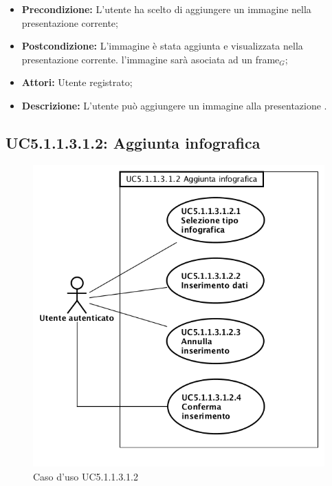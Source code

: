 \begin{itemize}
	\item \textbf{Precondizione:} L'utente ha scelto di aggiungere un immagine nella presentazione corrente;
	\item \textbf{Postcondizione:} L'immagine è stata aggiunta e visualizzata nella presentazione corrente. l'immagine sarà asociata ad un frame$_G$;
	\item \textbf{Attori:} Utente registrato;
	\item \textbf{Descrizione:} L'utente può aggiungere un immagine alla presentazione .
\end{itemize}

\subsection{ UC5.1.1.3.1.2: Aggiunta infografica}
\begin{figure}[h]
	\begin{center}
	\includegraphics[scale=0.6]{diagram/UC5-1-1-3-1-2.png}
	\caption{Caso d'uso UC5.1.1.3.1.2}
	\end{center}
\end{figure}
